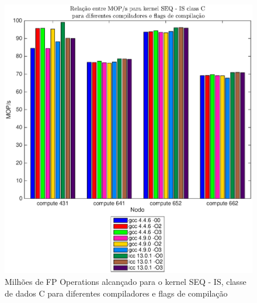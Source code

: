 \documentclass[conference,compsoc]{IEEEtran}
\begin{document}
\begin{figure}[H]
\centering
\includegraphics[width=1.1\columnwidth]{EPS/SEQ/MOPS_seq_is_C.eps}
\caption{Milhões de FP Operations alcançado para o kernel SEQ - IS, classe de dados C para diferentes compiladores e flags de compilação}
\label{mops_seq_is_c}
\end{figure}
\end{document}
